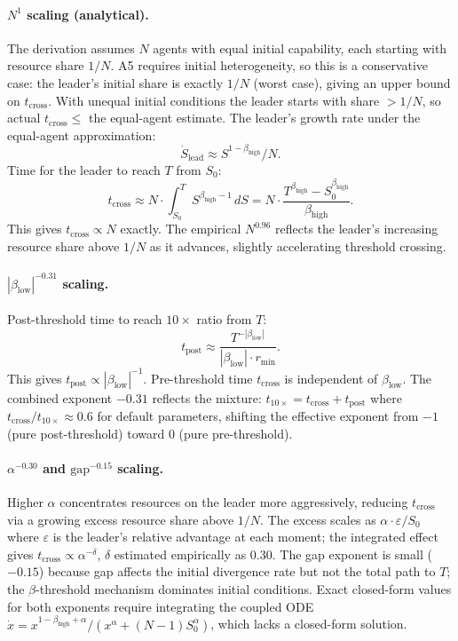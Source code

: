 \documentclass[11pt,letterpaper]{article}
\theoremstyle{plain}
\theoremstyle{definition}
\theoremstyle{remark}
\newcommand{\betaH}{\beta_{\mathrm{high}}}
\newcommand{\betaL}{\beta_{\mathrm{low}}}
\newcommand{\tcross}{t_{\mathrm{cross}}}
\newcommand{\rmin}{r_{\min}}
\begin{document}
\paragraph{$N^1$ scaling (analytical).}
The derivation assumes $N$ agents with equal initial capability, each
starting with resource share $1/N$.
A5 requires initial heterogeneity, so this is a conservative case: the
leader's initial share is exactly $1/N$ (worst case), giving an upper bound
on $\tcross$.
With unequal initial conditions the leader starts with share $> 1/N$,
so actual $\tcross \leq$ the equal-agent estimate.
The leader's growth rate under the equal-agent approximation:
\[
  \dot{S}_{\mathrm{lead}} \approx S^{1-\betaH} / N.
\]
Time for the leader to reach $T$ from $S_0$:
\[
  \tcross \approx N \cdot \int_{S_0}^T S^{\betaH - 1}\,dS
  = N \cdot \frac{T^{\betaH} - S_0^{\betaH}}{\betaH}.
\]
This gives $\tcross \propto N$ exactly.
The empirical $N^{0.96}$ reflects the leader's increasing resource share
above $1/N$ as it advances, slightly accelerating threshold crossing.

\paragraph{$|\betaL|^{-0.31}$ scaling.}
Post-threshold time to reach $10\times$ ratio from $T$:
\[
  t_{\mathrm{post}} \approx \frac{T^{-|\betaL|}}{|\betaL| \cdot \rmin}.
\]
This gives $t_{\mathrm{post}} \propto |\betaL|^{-1}$.
Pre-threshold time $\tcross$ is independent of $\betaL$.
The combined exponent $-0.31$ reflects the mixture: $t_{10\times} = \tcross + t_{\mathrm{post}}$
where $\tcross / t_{10\times} \approx 0.6$ for default parameters, shifting the
effective exponent from $-1$ (pure post-threshold) toward 0 (pure pre-threshold).

\paragraph{$\alpha^{-0.30}$ and $\mathrm{gap}^{-0.15}$ scaling.}
Higher $\alpha$ concentrates resources on the leader more aggressively,
reducing $\tcross$ via a growing excess resource share above $1/N$.
The excess scales as $\alpha \cdot \varepsilon / S_0$ where $\varepsilon$ is
the leader's relative advantage at each moment; the integrated effect gives
$\tcross \propto \alpha^{-\delta}$, $\delta$ estimated empirically as 0.30.
The gap exponent is small ($-0.15$) because gap affects the initial divergence
rate but not the total path to $T$; the $\beta$-threshold mechanism dominates
initial conditions.
Exact closed-form values for both exponents require integrating the coupled ODE
$\dot{x} = x^{1-\betaH+\alpha}/(x^\alpha + (N-1)S_0^\alpha)$, which lacks a
closed-form solution.
\end{document}
